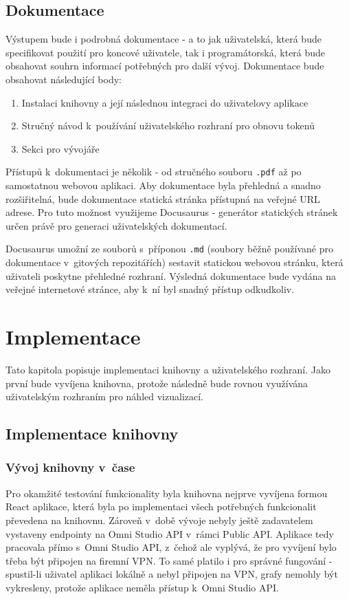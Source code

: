 \documentclass[czech, bc, kiv, he, iso690numb, viewonly]{fasthesis} %
\begin{document}
\section{Dokumentace}

Výstupem bude i podrobná dokumentace - a to jak uživatelská, která bude specifikovat použití pro koncové uživatele, tak i programátorská, která bude obsahovat souhrn informací potřebných
pro další vývoj. Dokumentace bude obsahovat následující body:

\begin{enumerate}
	\item Instalaci knihovny a její následnou integraci do uživatelovy aplikace
	\item Stručný návod k~používání uživatelského rozhraní pro obnovu tokenů
	\item Sekci pro vývojáře
\end{enumerate}

Přístupů k~dokumentaci je několik - od stručného souboru \texttt{.pdf} až po samostatnou webovou aplikaci. Aby dokumentace byla přehledná a snadno rozšiřitelná, bude dokumentace statická stránka
přístupná na veřejné URL adrese. Pro tuto možnost využijeme Docusaurus - generátor statických stránek určen právě pro generaci uživatelských dokumentací. 

Docusaurus umožní ze souborů s~příponou \texttt{.md} (soubory běžně používané pro dokumentace v~gitových repozitářích) sestavit statickou webovou stránku, která uživateli poskytne přehledné 
rozhraní. Výsledná dokumentace bude vydána na veřejné internetové stránce, aby k~ní byl snadný přístup odkudkoliv.


\chapter{Implementace}
Tato kapitola popisuje implementaci knihovny a uživatelského rozhraní. Jako první bude vyvíjena knihovna, protože následně bude rovnou využívána uživatelským rozhraním pro
náhled vizualizací.

\section{Implementace knihovny}

\subsection{Vývoj knihovny v~čase}

Pro okamžité testování funkcionality byla knihovna nejprve vyvíjena formou React aplikace, která byla po implementaci všech potřebných funkcionalit převedena na knihovnu.
Zároveň v~době vývoje nebyly ještě zadavatelem vystaveny endpointy na Omni Studio API v~rámci Public API. Aplikace tedy pracovala přímo s~Omni Studio API, z~čehož ale vyplývá,
že pro vyvíjení bylo třeba být připojen na firemní VPN. To samé platilo i pro správné fungování - spustil-li uživatel aplikaci lokálně a nebyl připojen na VPN, grafy nemohly být vykresleny,
protože aplikace neměla přístup k~Omni Studio API. 
\end{document}
